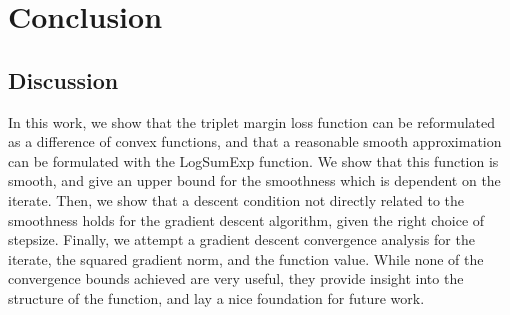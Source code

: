 \documentclass[11pt]{article}
\begin{document}







\section{Conclusion}

\subsection{Discussion}

In this work, we show that the triplet margin loss function can be reformulated as a difference of convex functions, and that a reasonable smooth approximation can be formulated with the LogSumExp function. We show that this function is smooth, and give an upper bound for the smoothness which is dependent on the iterate. Then, we show that a descent condition not directly related to the smoothness holds for the gradient descent algorithm, given the right choice of stepsize. Finally, we attempt a gradient descent convergence analysis for the iterate, the squared gradient norm, and the function value. While none of the convergence bounds achieved are very useful, they provide insight into the structure of the function, and lay a nice foundation for future work.
\end{document}

